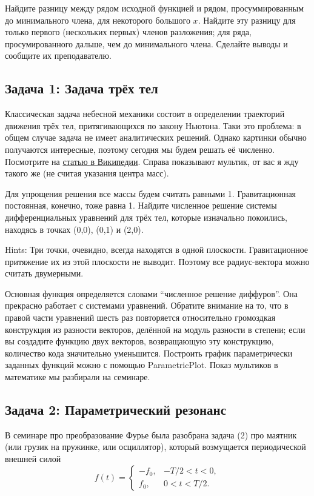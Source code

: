 \documentclass[a4paper,12pt]{article}
\theoremstyle{plain} %
\theoremstyle{definition} %
\theoremstyle{remark} %
\begin{document}
Найдите разницу между рядом исходной функцией и рядом, просуммированным до минимального члена, для некоторого большого $x$. Найдите эту разницу для только первого (нескольких первых) членов разложения; для ряда, просумированного дальше, чем до минимального члена. Сделайте выводы и сообщите их преподавателю.

\subsection*{Задача 1: Задача трёх тел}
Классическая задача небесной механики состоит в определении траекторий движения трёх тел, притягивающихся по закону Ньютона. Таки это проблема: в общем случае задача не имеет аналитических решений. Однако картинки обычно получаются интересные, поэтому сегодня мы будем решать её численно. Посмотрите на \href{https://ru.wikipedia.org/wiki/%D0%97%D0%B0%D0%B4%D0%B0%D1%87%D0%B0_%D1%82%D1%80%D1%91%D1%85_%D1%82%D0%B5%D0%BB}{статью в Википедии}. Справа показывают мультик, от вас я жду такого же (не считая указания центра масс).

Для упрощения решения все массы будем считать равными 1. Гравитационная постоянная, конечно, тоже равна 1. Найдите численное решение системы дифференциальных уравнений для трёх тел, которые изначально покоились, находясь в точках (0,0), (0,1) и (2,0).

Hints: Три точки, очевидно, всегда находятся в одной плоскости. Гравитационное притяжение их из этой плоскости не выводит. Поэтому все радиус-вектора можно считать двумерными. 

Основная функция определяется словами ``численное решение диффуров''. Она прекрасно работает с системами уравнений. Обратите внимание на то, что в правой части уравнений шесть раз повторяется относительно громоздкая конструкция из разности векторов, делённой на модуль разности в степени; если вы создадите функцию двух векторов, возвращающую эту конструкцию, количество кода значительно уменьшится. Построить график параметрически заданных функций можно с помощью ParametricPlot. Показ мультиков в математике мы разбирали на семинаре.

\subsection*{Задача 2: Параметрический резонанс}

В семинаре про преобразование Фурье была разобрана задача (2) про маятник (или грузик на пружинке, или осциллятор), который возмущается периодической внешней силой 
\begin{equation}
	f(t) = \begin{cases}
		-f_0,& -T/2<t<0, \\
		f_0,&  0<t<T/2.
	\end{cases}
\end{equation}
\end{document}

